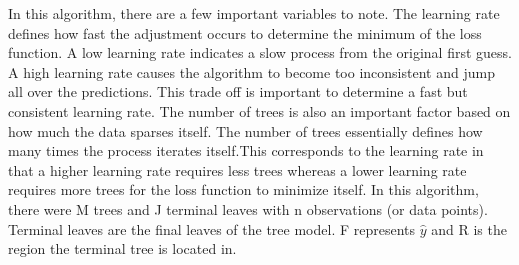 \documentclass[12pt]{article}
\begin{document}
In this algorithm, there are a few important variables to note. The learning rate defines how fast the adjustment occurs to determine the minimum of the loss function. A low learning rate indicates a slow process from the original first guess. A high learning rate causes the algorithm to become too inconsistent and jump all over the predictions. This trade off is important to determine a fast but consistent learning rate. 
The number of trees is also an important factor based on how much the data sparses itself. The number of trees essentially defines how many times the process iterates itself.This corresponds to the learning rate in that a higher learning rate requires less trees whereas a lower learning rate requires more trees for the loss function to minimize itself.
In this algorithm, there were M trees and J terminal leaves with n observations (or data points). Terminal leaves are the final leaves of the tree model. F represents $\hat{y}$ and R is the region the terminal tree is located in.
\end{document}
